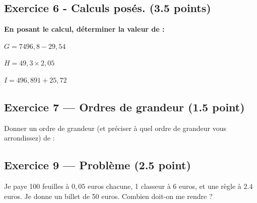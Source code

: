 \documentclass{exam}
\begin{document}
\subsection*{Exercice 6 - Calculs posés. (3.5 points)}

\textbf{En posant le calcul, déterminer la valeur de :}
\begin{questions}
  \question[1] $G = 7496,8 - 29,54$
  
\question[1.5] $H = 49,3 \times 2,05$
  
\question[1] $I = 496,891 + 25,72$
\end{questions}


\subsection*{Exercice 7 — Ordres de grandeur (1.5 point)}

\begin{questions}
  \question Donner un ordre de grandeur (et préciser à quel ordre de grandeur vous arrondissez) de :

  
\end{questions}

\subsection*{Exercice 9 — Problème (2.5 point)}

\begin{questions}
  \question Je paye 100 feuilles à $0,05$ euros chacune, 1 classeur à 6 euros, et une règle à 2.4 euros. Je donne un billet de 50 euros.  
  Combien doit-on me rendre ?
\end{questions}


\end{document}
